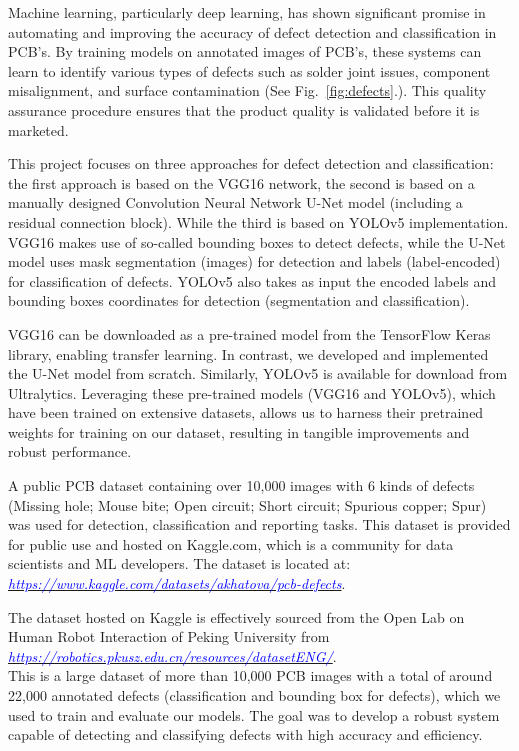 \documentclass[12pt]{article}
\begin{document}
Machine learning, particularly deep learning, has shown significant promise in automating and improving the accuracy of defect detection and classification in PCB's. By training models on annotated images of PCB's, these systems can learn to identify various types of defects such as solder joint issues, component misalignment, and surface contamination (See Fig.~\ref{fig:defects}.). This quality assurance procedure ensures that the product quality is validated before it is marketed.

This project focuses on three approaches for defect detection and classification: the first approach is based on the VGG16 network, the second is based on a manually designed Convolution Neural Network U-Net model (including a residual connection block). While the third is based on YOLOv5 implementation. 
VGG16 makes use of so-called bounding boxes to detect defects, while the U-Net model uses mask segmentation (images) for detection and labels (label-encoded) for classification of defects. YOLOv5 also takes as input the encoded labels and bounding boxes coordinates for detection (segmentation and classification).

VGG16 can be downloaded as a pre-trained model from the TensorFlow Keras library, enabling transfer learning. In contrast, we developed and implemented the U-Net model from scratch. Similarly, YOLOv5 is available for download from Ultralytics. Leveraging these pre-trained models (VGG16 and YOLOv5), which have been trained on extensive datasets, allows us to harness their pretrained weights for training on our dataset, resulting in tangible improvements and robust performance.

A public PCB dataset containing over 10,000 images with 6 kinds of defects (Missing hole; Mouse bite; Open circuit; Short circuit; Spurious copper; Spur) was used for detection, classification and reporting tasks. This dataset is provided for public use and hosted on Kaggle.com, which is a community for data scientists and ML developers. The dataset is located at:\\ {\href{https://www.kaggle.com/datasets/akhatova/pcb-defects}{\textit{\textcolor{blue}{https://www.kaggle.com/datasets/akhatova/pcb-defects}}}}.

The dataset hosted on Kaggle is effectively sourced from the Open Lab on Human Robot Interaction of Peking University from\\
\href{https://robotics.pkusz.edu.cn/resources/datasetENG/}{\textit{\textcolor{blue}{https://robotics.pkusz.edu.cn/resources/datasetENG/}}}.\\
This is a large dataset of more than 10,000 PCB images with a total of around 22,000 annotated defects (classification and bounding box for defects), which we used to train and evaluate our models. The goal was to develop a robust system capable of detecting and classifying defects with high accuracy and efficiency.
\end{document}
